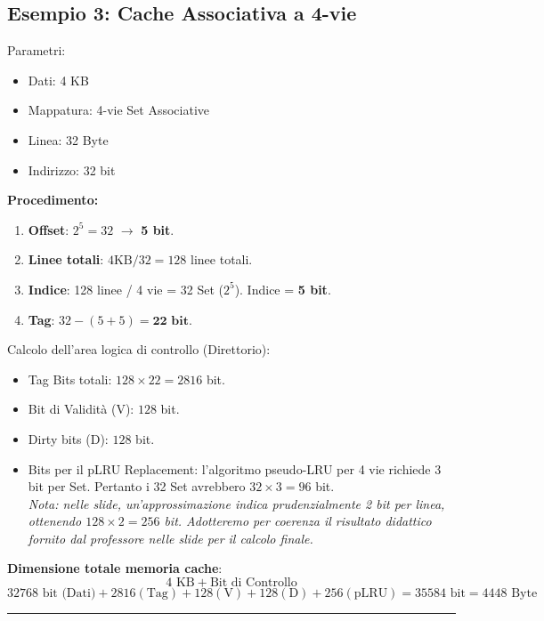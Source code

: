 \subsection{Esempio 3: Cache Associativa a 4-vie}
Parametri:
\begin{itemize}
    \item Dati: 4 KB
    \item Mappatura: 4-vie Set Associative
    \item Linea: 32 Byte
    \item Indirizzo: 32 bit
\end{itemize}

\textbf{Procedimento:}
\begin{enumerate}
    \item \textbf{Offset}: $2^5 = 32$ $\rightarrow$ \textbf{5 bit}.
    \item \textbf{Linee totali}: $4\text{KB}/32 = 128$ linee totali.
    \item \textbf{Indice}: 128 linee / 4 vie = 32 Set ($2^5$). Indice = \textbf{5 bit}.
    \item \textbf{Tag}: $32 - (5 + 5) = \textbf{22 bit}$.
\end{enumerate}

Calcolo dell'area logica di controllo (Direttorio):
\begin{itemize}
    \item Tag Bits totali: $128 \times 22 = 2816$ bit.
    \item Bit di Validità (V): $128$ bit.
    \item Dirty bits (D): $128$ bit.
    \item Bits per il pLRU Replacement: l'algoritmo pseudo-LRU per 4 vie richiede 3 bit per Set. Pertanto i 32 Set avrebbero $32 \times 3 = 96$ bit. \\
    \textit{Nota: nelle slide, un'approssimazione indica prudenzialmente 2 bit per linea, ottenendo $128 \times 2 = 256$ bit. Adotteremo per coerenza il risultato didattico fornito dal professore nelle slide per il calcolo finale.}
\end{itemize}

\textbf{Dimensione totale memoria cache}:
\[ 4 \text{ KB} + \text{Bit di Controllo} \]
\[ 32768 \text{ bit (Dati)} + 2816 (\text{Tag}) + 128 (\text{V}) + 128 (\text{D}) + 256 (\text{pLRU}) = 35584 \text{ bit} = 4448 \text{ Byte} \]

\vspace{1cm}
\hrule
\vspace{0.5cm}

